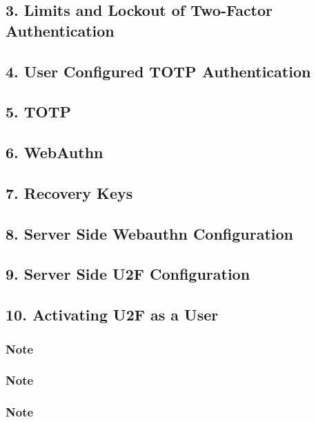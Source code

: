 \subsection{3. Limits and Lockout of Two-Factor Authentication}

\subsection{4. User Configured TOTP Authentication}

\subsection{5. TOTP}

\subsection{6. WebAuthn}

\subsection{7. Recovery Keys}

\subsection{8. Server Side Webauthn Configuration}

\subsection{9. Server Side U2F Configuration}

\subsection{10. Activating U2F as a User}

\subsubsection{Note}

\subsubsection{Note}

\subsubsection{Note}

